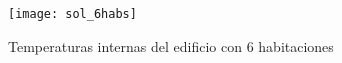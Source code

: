 \begin{figure}[h!]
	\centering
	\texttt{[image: sol\_6habs]}
	\caption{Temperaturas internas del edificio con 6 habitaciones}
	\label{fig:caso2}
\end{figure}




\endinput
-